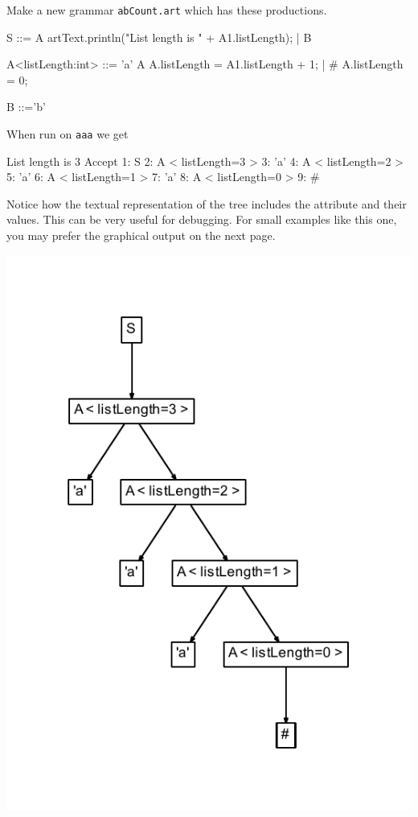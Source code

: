 Make a new grammar {\tt abCount.art} which has these productions.
\begin{codeblock}
S ::= A { artText.println("List length is " + A1.listLength); } | B

A<listLength:int> ::= 'a' A { A.listLength = A1.listLength + 1; } 
                    |  # { A.listLength = 0; } 

B ::='b'
\end{codeblock}
When run on {\tt aaa} we get 
\begin{codeblock}
List length is 3
Accept
1: S
  2: A < listLength=3 >
    3: 'a'
    4: A < listLength=2 >
      5: 'a'
      6: A < listLength=1 >
        7: 'a'
        8: A < listLength=0 >
          9: #
\end{codeblock}
Notice how the textual representation of the tree includes the attribute and their values. This can be very useful for debugging. For small examples like this one, you may prefer the graphical output on the next page.

\includegraphics[scale=1]{abCount.pdf}

